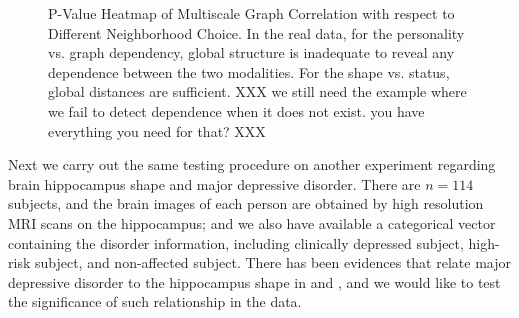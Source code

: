 \documentclass[11pt]{article}
\begin{document}
\begin{figure}[htbp]
\centering
{}
\hfil
\centering
{}
\hfil
\centering
{}
\caption{P-Value Heatmap of Multiscale Graph Correlation with respect to Different Neighborhood Choice.  In the real data, for the personality vs. graph dependency, global structure is inadequate to reveal any dependence between the two modalities.  For the shape vs. status,  global distances are sufficient.  XXX we still need the example where we fail to detect dependence when it does not exist.  you have everything you need for that? XXX}
\label{figReal}
\end{figure}

Next we carry out the same testing procedure on another experiment regarding brain hippocampus shape and major depressive disorder. There are $n=114$ subjects, and the brain images of each person are obtained by high resolution MRI scans on the hippocampus; and we also have available a categorical vector containing the disorder information, including clinically depressed subject, high-risk subject, and non-affected subject. There has been evidences that relate major depressive disorder to the hippocampus shape in \cite{ParkEtAl2011} and \cite{PosenerEtAl2003}, and we would like to test the significance of such relationship in the data. 
\end{document}
